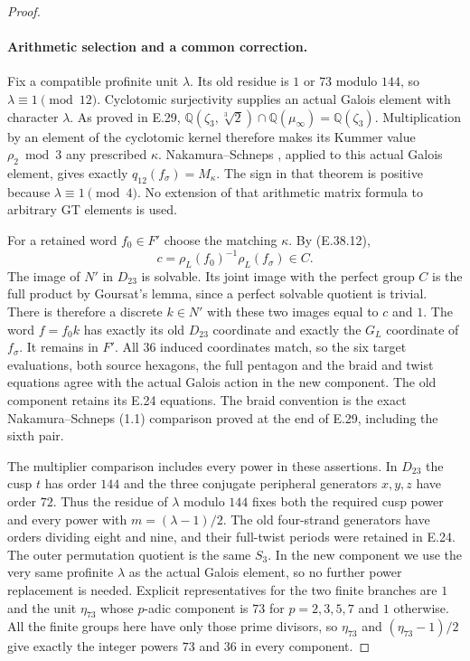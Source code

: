 \begin{proof}
\paragraph{Arithmetic selection and a common correction.}
Fix a compatible profinite unit $\lambda$.
Its old residue is $1$ or $73$ modulo $144$,
so $\lambda\equiv1\pmod{12}$.  Cyclotomic
surjectivity supplies an actual Galois
element with character $\lambda$.
As proved in E.29,
$\mathbb Q(\zeta_3,\sqrt[3]{2})\cap
 \mathbb Q(\mu_\infty)=\mathbb Q(\zeta_3)$.
Multiplication by an element of the
cyclotomic kernel therefore makes its
Kummer value $\rho_2\bmod3$ any prescribed
$\kappa$.  Nakamura--Schneps
\cite[Theorem 2.5]{BCNakamuraSchneps2000},
applied to this actual Galois element,
gives exactly $q_{12}(f_\sigma)=M_\kappa$.
The sign in that theorem is positive
because $\lambda\equiv1\pmod4$.
No extension of that arithmetic matrix
formula to arbitrary GT elements is used.

For a retained word $f_0\in F'$ choose
the matching $\kappa$.  By
\textup{(E.38.12)},
\[
             c=\rho_L(f_0)^{-1}\rho_L(f_\sigma)\in C.
 \tag{E.38.14}
\]
The image of $N'$ in $D_{23}$ is solvable.
Its joint image with the perfect group $C$
is the full product by Goursat's lemma,
since a perfect solvable quotient is trivial.
There is therefore a discrete $k\in N'$
with these two images equal to $c$ and $1$.
The word $f=f_0k$ has exactly its old
$D_{23}$ coordinate and exactly the
$G_L$ coordinate of $f_\sigma$.
It remains in $F'$.
All $36$ induced coordinates match, so
the six target evaluations, both source
hexagons, the full pentagon and the braid
and twist equations agree with the actual
Galois action in the new component.
The old component retains its E.24 equations.
The braid convention is the exact
Nakamura--Schneps (1.1) comparison proved
at the end of E.29, including the sixth pair.

The multiplier comparison includes every
power in these assertions.  In $D_{23}$
the cusp $t$ has order $144$ and the three
conjugate peripheral generators $x,y,z$
have order $72$.  Thus the residue of
$\lambda$ modulo $144$ fixes both the
required cusp power and every power with
$m=(\lambda-1)/2$.  The old four-strand
generators have orders dividing eight
and nine, and their full-twist periods
were retained in E.24.  The outer
permutation quotient is the same $S_3$.
In the new component we use the very same
profinite $\lambda$ as the actual Galois
element, so no further power replacement
is needed.  Explicit representatives for
the two finite branches are $1$ and the
unit $\eta_{73}$ whose $p$-adic component
is $73$ for $p=2,3,5,7$ and $1$ otherwise.
All the finite groups here have only those
prime divisors, so $\eta_{73}$ and
$(\eta_{73}-1)/2$ give exactly the integer
powers $73$ and $36$ in every component.


\end{proof}
